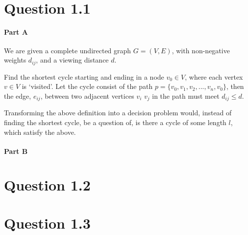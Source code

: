 \documentclass[10pt]{article}
\author{\authorName \\\texttt{\small{\authorEmail}}}
\title{\textsc{\titleName \\ \courseName}}
\begin{document}
\maketitle    

\section*{Question 1.1} %
\label{sec:question_1_1}
\paragraph{Part A} %
\label{par:part_a}

We are given a complete undirected graph $G = (V,E)$, with non-negative weights $d_{ij}$, and a viewing distance $d$. 

Find the shortest cycle starting and ending in a node $v_0 \in V$, where each vertex $v \in V$ is `visited'. Let the cycle consist of the path $p = \{v_0, v_1,v_2,...,v_n, v_0\}$, then the edge, $e_{ij}$, between two adjacent vertices $v_i$ $v_j$ in the path must meet $d_{ij}\leq d$. 

Transforming the above definition into a decision problem would, instead of finding the shortest cycle, be a question of, is there a cycle of some length $l$, which satisfy the above.




\paragraph{Part B} %
\label{par:part_b}


\section*{Question 1.2} %
\label{sec:question_1_2}

\section*{Question 1.3} %
\label{sec:question_1_3}
\end{document}
